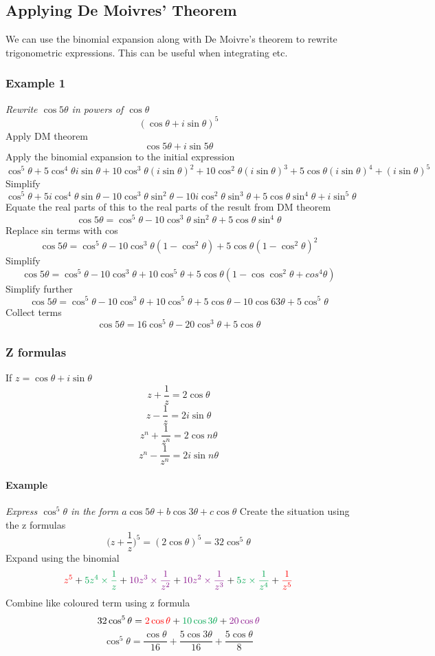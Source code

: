 \documentclass{article}[18pt]
\begin{document}
\subsection{Applying De Moivres' Theorem}
We can use the binomial expansion along with De Moivre's theorem to rewrite trigonometric expressions. This can be useful when integrating etc.
\subsubsection{Example 1}
\textit{Rewrite $\cos5\theta$ in powers of $\cos\theta$}
$$(\cos\theta+i\sin\theta)^5$$
Apply DM theorem
$$\cos5\theta+i\sin5\theta$$
Apply the binomial expansion to the initial expression
$$\cos^5\theta+5\cos^4\theta i\sin\theta+10\cos^3\theta(i\sin\theta)^2+10\cos^2\theta(i\sin\theta)^3+5\cos\theta(i\sin\theta)^4+(i\sin\theta)^5$$
Simplify
$$\cos^5\theta+5i\cos^4\theta\sin\theta-10\cos^3\theta\sin^2\theta-10i\cos^2\theta\sin^3\theta+5\cos\theta\sin^4\theta+i\sin^5\theta$$
Equate the real parts of this to the real parts of the result from DM theorem
$$\cos5\theta=\cos^5\theta-10\cos^3\theta\sin^2\theta+5\cos\theta\sin^4\theta$$
Replace sin terms with cos
$$\cos5\theta=\cos^5\theta-10\cos^3\theta(1-\cos^2\theta)+5\cos\theta(1-\cos^2\theta)^2$$
Simplify
$$\cos5\theta=\cos^5\theta-10\cos^3\theta+10\cos^5\theta+5\cos\theta(1-\cos\cos^2\theta+cos^4\theta)$$
Simplify further
$$\cos5\theta=\cos^5\theta-10\cos^3\theta+10\cos^5\theta+5\cos\theta-10\cos63\theta+5\cos^5\theta$$
Collect terms
$$\cos5\theta=16\cos^5\theta-20\cos^3\theta+5\cos\theta$$
\newpage
\subsubsection{Z formulas}
If $z=\cos\theta+i\sin\theta$
$$z+\frac{1}{z}=2\cos\theta$$
$$z-\frac{1}{z}=2i\sin\theta$$
$$z^n+\frac{1}{z^n}=2\cos n\theta$$
$$z^n-\frac{1}{z^n}=2i\sin n\theta$$
\paragraph{Example}
\textit{Express $\cos^5\theta$ in the form $a\cos5\theta+b\cos3\theta+c\cos\theta$}
Create the situation using the z formulas
$$\Bigg(z+\frac{1}{z}\Bigg)^5=(2\cos\theta)^5=32\cos^5\theta$$ 
Expand using the binomial
$$\textcolor{red}{z^5}+\textcolor{Green}{5z^4\times\frac{1}{z}}+\textcolor{Plum}{10z^3\times\frac{1}{z^2}}+\textcolor{Plum}{10z^2\times\frac{1}{z^3}}+\textcolor{Green}{5z\times\frac{1}{z^4}}+\textcolor{red}{\frac{1}{z^5}}$$
Combine like coloured term using z formula
$$32\cos^5\theta=\textcolor{red}{2\cos\theta}+\textcolor{Green}{10\cos3\theta}+\textcolor{Plum}{20\cos\theta}$$
$$\cos^5\theta=\frac{\cos\theta}{16}+\frac{5\cos3\theta}{16}+\frac{5\cos\theta}{8}$$
\end{document}
